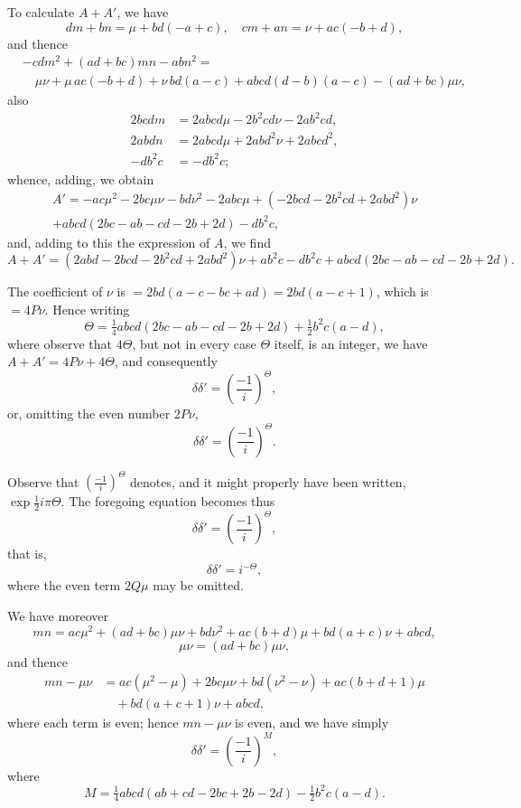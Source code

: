 \documentclass[11pt,a4paper]{article}
\theoremstyle{definition}
\begin{document}
To calculate $A + A'$, we have
\[
dm + bn = \mu + bd(-a + c), \quad cm + an = \nu + ac(-b + d),
\]
and thence
\begin{align*}
&-cdm^2 + (ad + bc)mn - abn^2 =\\
&\quad \mu\nu + \mu\,ac(-b + d) + \nu\,bd(a - c) + abcd(d - b)(a - c) - (ad + bc)\mu\nu,
\end{align*}
also
\begin{align*}
2bcdm &= 2abcd\mu - 2b^2cd\nu - 2ab^2cd,\\
2abdn &= 2abcd\mu + 2abd^2\nu + 2abcd^2,\\
-db^2c &= -db^2c;
\end{align*}
whence, adding, we obtain
\begin{align*}
A' = -ac\mu^2 - 2bc\mu\nu - bd\nu^2 - 2abc\mu + (-2bcd - 2b^2cd + 2abd^2)\nu\\
+ abcd(2bc - ab - cd - 2b + 2d) - db^2c,
\end{align*}
and, adding to this the expression of $A$, we find
\[
A + A' = (2abd - 2bcd - 2b^2cd + 2abd^2)\nu + ab^2c - db^2c + abcd(2bc - ab - cd - 2b + 2d).
\]

The coefficient of $\nu$ is $= 2bd(a - c - bc + ad) = 2bd(a - c + 1)$, which is $= 4P\nu$. Hence writing
\[
\Theta = \tfrac{1}{4}abcd(2bc - ab - cd - 2b + 2d) + \tfrac{1}{2}b^2c(a - d),
\]
where observe that $4\Theta$, but not in every case $\Theta$ itself, is an integer, we have $A + A' = 4P\nu + 4\Theta$, and consequently
\[
\delta\delta' = \left(\frac{-1}{i}\right)^{\Theta},
\]
or, omitting the even number $2P\nu$,
\[
\delta\delta' = \left(\frac{-1}{i}\right)^{\Theta}.
\]

Observe that $\left(\frac{-1}{i}\right)^{\Theta}$ denotes, and it might properly have been written, $\exp\frac{1}{2}i\pi\Theta$. The foregoing equation becomes thus
\[
\delta\delta' = \left(\frac{-1}{i}\right)^{\Theta},
\]
that is,
\[
\delta\delta' = i^{-\Theta},
\]
where the even term $2Q\mu$ may be omitted.

We have moreover
\[
mn = ac\mu^2 + (ad + bc)\mu\nu + bd\nu^2 + ac(b + d)\mu + bd(a + c)\nu + abcd,
\]
\[
\mu\nu = (ad + bc)\mu\nu,
\]
and thence
\begin{align*}
mn - \mu\nu &= ac(\mu^2 - \mu) + 2bc\mu\nu + bd(\nu^2 - \nu) + ac(b + d + 1)\mu\\
&\quad + bd(a + c + 1)\nu + abcd,
\end{align*}
where each term is even; hence $mn - \mu\nu$ is even, and we have simply
\[
\delta\delta' = \left(\frac{-1}{i}\right)^{M},
\]
where
\[
M = \tfrac{1}{4}abcd(ab + cd - 2bc + 2b - 2d) - \tfrac{1}{2}b^2c(a - d).
\]
\end{document}

